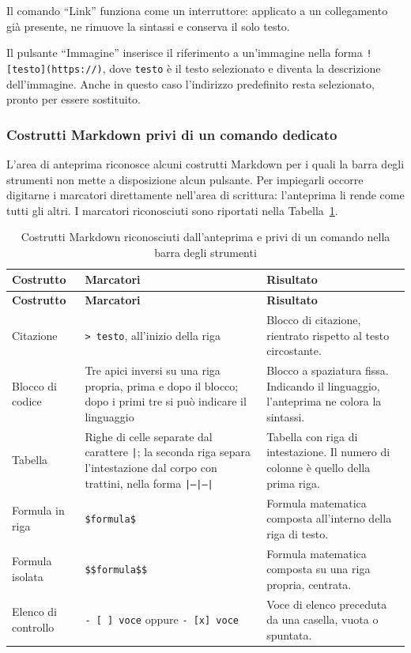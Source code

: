 \documentclass[a4paper, 10pt]{article}
\begin{document}
Il comando ``Link'' funziona come un interruttore: applicato a un collegamento già presente, ne rimuove la sintassi e conserva il solo testo.

Il pulsante ``Immagine'' inserisce il riferimento a un'immagine nella forma \texttt{![testo]\allowbreak(https://)}, dove \texttt{testo} è il testo selezionato e diventa la descrizione dell'immagine. Anche in questo caso l'indirizzo predefinito resta selezionato, pronto per essere sostituito.

\subsubsection{Costrutti Markdown privi di un comando dedicato}
\label{sec:costrutti-senza-comando}
L'area di anteprima riconosce alcuni costrutti Markdown per i quali la barra degli strumenti non mette a disposizione alcun pulsante. Per impiegarli occorre digitarne i marcatori direttamente nell'area di scrittura: l'anteprima li rende come tutti gli altri. I marcatori riconosciuti sono riportati nella Tabella~\ref{tab:costrutti-senza-comando}.

\begingroup
\small
\begin{longtable}{|p{2.8cm}|p{4.6cm}|p{4.9cm}|}
    \caption{Costrutti Markdown riconosciuti dall'anteprima e privi di un comando nella barra degli strumenti}
    \label{tab:costrutti-senza-comando} \\
    \hline
    \textbf{Costrutto} & \textbf{Marcatori} & \textbf{Risultato} \\
    \hline
    \endfirsthead
    \hline
    \textbf{Costrutto} & \textbf{Marcatori} & \textbf{Risultato} \\
    \hline
    \endhead
    Citazione & \texttt{> testo}, all'inizio della riga & Blocco di citazione, rientrato rispetto al testo circostante. \\ \hline

    Blocco di codice & Tre apici inversi su una riga propria, prima e dopo il blocco; dopo i primi tre si può indicare il linguaggio & Blocco a spaziatura fissa. Indicando il linguaggio, l'anteprima ne colora la sintassi. \\ \hline

    Tabella & Righe di celle separate dal carattere \texttt{|}; la seconda riga separa l'intestazione dal corpo con trattini, nella forma \texttt{|---|---|} & Tabella con riga di intestazione. Il numero di colonne è quello della prima riga. \\ \hline

    Formula in riga & \texttt{\$formula\$} & Formula matematica composta all'interno della riga di testo. \\ \hline

    Formula isolata & \texttt{\$\$formula\$\$} & Formula matematica composta su una riga propria, centrata. \\ \hline

    Elenco di controllo & \texttt{- [ ] voce} oppure \texttt{- [x] voce} & Voce di elenco preceduta da una casella, vuota o spuntata. \\ \hline

\end{longtable}
\endgroup
\end{document}

